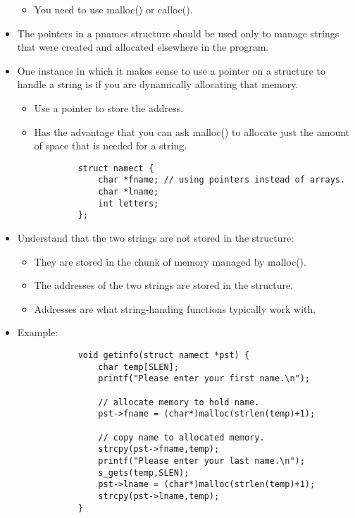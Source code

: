\begin{itemize}
\begin{itemize}
            \item You need to use malloc() or calloc().
        \end{itemize}
    
    \item The pointers in a pnames structure should be used only to manage strings that were created and allocated elsewhere in the program. 
    \item One instance in which it makes sense to use a pointer on a structure to handle a string is if you are dynamically allocating that memory. 
        \begin{itemize}
            \item Use a pointer to store the address. 
            \item Has the advantage that you can ask malloc() to allocate just the amount of space that is needed for a string. 
        \end{itemize}
        \begin{verbatim}
            struct namect {
                char *fname; // using pointers instead of arrays. 
                char *lname;
                int letters;
            };
        \end{verbatim}
    
    \item Understand that the two strings are not stored in the structure:
        \begin{itemize}
            \item They are stored in the chunk of memory managed by malloc().
            \item The addresses of the two strings are stored in the structure.
            \item Addresses are what string-handing functions typically work with. 
        \end{itemize}
    
    \item Example: 
        \begin{verbatim}
            void getinfo(struct namect *pst) {
                char temp[SLEN]; 
                printf("Please enter your first name.\n"); 
                
                // allocate memory to hold name.
                pst->fname = (char*)malloc(strlen(temp)+1);
            
                // copy name to allocated memory. 
                strcpy(pst->fname,temp);
                printf("Please enter your last name.\n");
                s_gets(temp,SLEN);
                pst->lname = (char*)malloc(strlen(temp)+1);
                strcpy(pst->lname,temp);
            }
        \end{verbatim}
\end{itemize}



